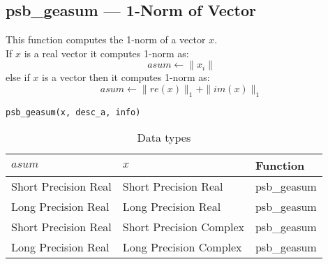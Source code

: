 %
%


\clearpage\subsection*{psb\_geasum --- 1-Norm of Vector}    

This function computes the 1-norm of a vector $x$.\\
If $x$ is a real vector
it computes 1-norm as:
\[ asum \leftarrow  \|x_i\|\]
else if $x$ is a  vector then it computes 1-norm  as:
\[ asum \leftarrow \|re(x)\|_1 + \|im(x)\|_1\]


\begin{verbatim}
psb_geasum(x, desc_a, info)
\end{verbatim}

\begin{table}[h]
\begin{center}
\begin{tabular}{lll}
\hline
$asum$ & $x$ & {\bf Function}\\
\hline
Short Precision Real&Short Precision Real & psb\_geasum \\
Long Precision Real&Long Precision Real & psb\_geasum \\
Short Precision Real&Short Precision Complex & psb\_geasum \\
Long Precision Real&Long Precision Complex & psb\_geasum \\
\hline
\end{tabular}
\end{center}
\caption{Data types\label{tab:f90asum}}
\end{table}

